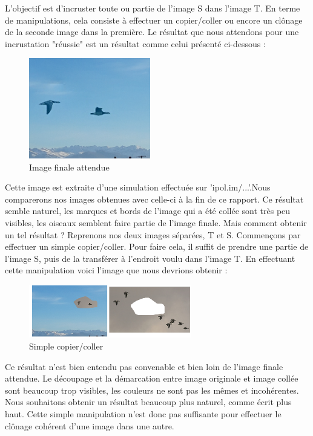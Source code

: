 L'objectif est d'incruster toute ou partie de l'image S dans l'image T. En terme de manipulations, cela consiste à effectuer un copier/coller ou encore un clônage de la seconde image dans la première.
Le résultat que nous attendons pour une incrustation "réussie" est un résultat comme celui présenté ci-dessous : 
    
\begin{center}
\begin{figure}[!htb]
   \centering
     \includegraphics[width = 150pt]{Images/clonage_done.png}
     \caption{Image  finale attendue}
\end{figure}
\end{center}
Cette image est extraite d'une simulation effectuée sur 'ipol.im/...'.Nous comparerons nos images obtenues avec celle-ci à la fin de ce rapport.\newline
Ce résultat semble naturel, les marques et bords de l'image qui a été collée sont très peu visibles, les oiseaux semblent faire partie de l'image finale.
Mais comment obtenir un tel résultat ? 
\newline
Reprenons nos deux images séparées, T et S. Commençons par effectuer un simple copier/coller. Pour faire cela, il suffit de prendre une partie de l'image S,  puis de la transférer à l'endroit voulu dans l'image T. En effectuant cette manipulation voici l'image que nous devrions obtenir : 
\begin{center}
\begin{figure}[H]
     \centering
     \includegraphics[width = 200pt]{Images/collage1.jpg}
     \caption{Simple copier/coller}
\end{figure}
\end{center}

Ce résultat n'est bien entendu pas convenable et bien loin de l'image finale attendue. Le découpage et la démarcation entre image originale et image collée sont beaucoup trop visibles, les couleurs ne sont pas les mêmes et incohérentes. Nous souhaitons obtenir un résultat beaucoup plus naturel, comme écrit plus haut. Cette simple manipulation n'est donc pas suffisante pour effectuer le clônage cohérent d'une image dans une autre. \newline

